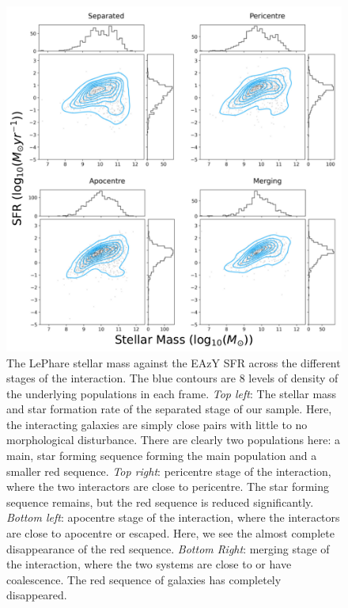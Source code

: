 \begin{figure}
    \centering
    \includegraphics[width = \textwidth]{Chapter3/figures/sfr-mass-stages.pdf}
    \caption[The LePhare stellar mass against the EAzY SFR across the different stages of the interaction.]{The LePhare stellar mass against the EAzY SFR across the different stages of the interaction. The blue contours are 8 levels of density of the underlying populations in each frame. \textit{Top left}: The stellar mass and star formation rate of the separated stage of our sample. Here, the interacting galaxies are simply close pairs with little to no morphological disturbance. There are clearly two populations here: a main, star forming sequence forming the main population and a smaller red sequence. \textit{Top right}: pericentre stage of the interaction, where the two interactors are close to pericentre. The star forming sequence remains, but the red sequence is reduced significantly. \textit{Bottom left}: apocentre stage of the interaction, where the interactors are close to apocentre or escaped. Here, we see the almost complete disappearance of the red sequence. \textit{Bottom Right}: merging stage of the interaction, where the two systems are close to or have coalescence. The red sequence of galaxies has completely disappeared.}
    \label{fig:sfr-mass}
\end{figure}

